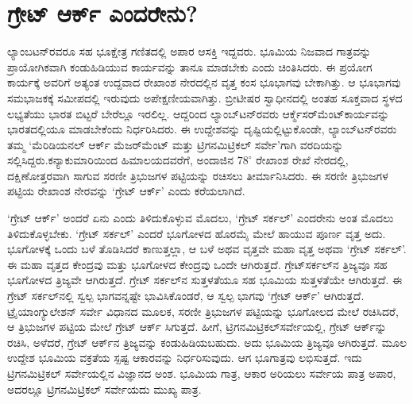 
\chapter{ಗ್ರೇಟ್​ ಆರ್ಕ್ ಎಂದರೇನು?}

ಲ್ಯಾಂಬಟನ್​ರವರೂ ಸಹ ಭೂಕ್ಷೇತ್ರ ಗಣಿತದಲ್ಲಿ ಅಪಾರ ಆಸಕ್ತಿ ಇದ್ದವರು. ಭೂಮಿಯ ನಿಜವಾದ ಗಾತ್ರವನ್ನು ಪ್ರಾಯೋಗಿಕವಾಗಿ ಕಂಡುಹಿಡಿಯುವ ಕಾರ್ಯವನ್ನು ತಾನೂ ಮಾಡಬೇಕು ಎಂದು ಚಿಂತಿಸಿದರು. ಈ ಪ್ರಯೋಗ ಕಾರ್ಯಕ್ಕೆ ಅವರಿಗೆ ಅತ್ಯಂತ ಉದ್ದವಾದ ರೇಖಾಂಶ ನೇರದಲ್ಲಿನ ವೃತ್ತ ಕಂಸ ಭೂಭಾಗವು ಬೇಕಾಗಿತ್ತು. ಆ ಭೂಭಾಗವು ಸಮಭಾಜಕಕ್ಕೆ ಸಮೀಪದಲ್ಲಿ ಇರುವುದು ಅಪೇಕ್ಷಣೀಯವಾಗಿತ್ತು. ಬ್ರೀಟೀಷರ ಸ್ವಾಧೀನದಲ್ಲಿ ಅಂತಹ ಸೂಕ್ತವಾದ ಸ್ಥಳದ ಲಭ್ಯತೆಯು ಭಾರತ ಬಿಟ್ಟರೆ ಬೇರೆಲ್ಲೂ ಇರಲಿಲ್ಲ. ಆದ್ದರಿಂದ ಲ್ಯಾಂಬ್​ಟನ್​ರವರು ಆರ್ಕ್\break ಮೆಸರ್​ಮೆಂಟ್​ ಕಾರ್ಯವನ್ನು ಭಾರತದಲ್ಲಿಯೂ ಮಾಡಬೇಕೆಂದು ನಿರ್ಧರಿಸಿದರು. ಈ ಉದ್ದೇಶವನ್ನು ದೃಷ್ಟಿಯಲ್ಲಿಟ್ಟುಕೊಂಡೇ, ಲ್ಯಾಂಬ್​ಟನ್​ರವರು ತಮ್ಮ ‘ಮೆರಿಡಿಯನಲ್​ ಆರ್ಕ್ ಮೆಜರ್​ಮೆಂಟ್​ ಮತ್ತು ಟ್ರಿಗನಮಿಟ್ರಿಕಲ್​ ಸರ್ವೇ’ಗಾಗಿ ವರದಿಯನ್ನು ಸಲ್ಲಿಸಿದ್ದರು.\break ಕನ್ಯಾಕುಮಾರಿಯಿಂದ ಹಿಮಾಲಯದವರೆಗೆ, ಅಂದಾಜಿನ $78^\circ$ ರೇಖಾಂಶ ರೇಖೆ ನೇರದಲ್ಲಿ, ದಕ್ಷಿಣೋತ್ತರವಾಗಿ ಸಾಗುವ ಸರಣೀ ತ್ರಿಭುಜಗಳ ಪಟ್ಟಿಯನ್ನು ರಚಿಸಲು ತೀರ್ಮಾನಿಸಿದರು. ಈ ಸರಣೀ ತ್ರಿಭುಜಗಳ ಪಟ್ಟಿಯ ರೇಖಾಂಶ ನೇರವನ್ನು ‘ಗ್ರೇಟ್​ ಆರ್ಕ್’ ಎಂದು ಕರೆಯಲಾಗಿದೆ.

`ಗ್ರೇಟ್​ ಆರ್ಕ್’ ಅಂದರೆ ಏನು ಎಂದು ತಿಳಿದುಕೊಳ್ಳುವ ಮೊದಲು, ‘ಗ್ರೇಟ್​ ಸರ್ಕಲ್​’ ಎಂದರೇನು ಅಂತ ಮೊದಲು ತಿಳಿದುಕೊಳ್ಳಬೇಕು. ‘ಗ್ರೇಟ್​ ಸರ್ಕಲ್​’ ಎಂದರೆ ಭೂಗೋಳದ ಹೊರಮೈ ಮೇಲೆ ಹಾಯುವ ಪೂರ್ಣ ವೃತ್ತ ಅದು. ಭೂಗೋಳಕ್ಕೆ ಒಂದು ಬಳೆ ತೊಡಿಸಿದರೆ ಕಾಣುತ್ತಲ್ಲಾ, ಆ ಬಳೆ ಅಥವ ವೃತ್ತವೇ ಮಹಾ ವೃತ್ತ ಅಥವಾ ‘ಗ್ರೇಟ್​ ಸರ್ಕಲ್​’. ಈ ಮಹಾ ವೃತ್ತದ ಕೇಂದ್ರವು ಮತ್ತು ಭೂಗೋಳದ ಕೇಂದ್ರವು ಒಂದೇ ಆಗಿರುತ್ತದೆ. ಗ್ರೇಟ್​ ಸರ್ಕಲ್​ನ ತ್ರಿಜ್ಯವೂ ಸಹ ಭೂಗೋಳದ ತ್ರಿಜ್ಯವೇ ಆಗಿರುತ್ತದೆ. ಗ್ರೇಟ್​ ಸರ್ಕಲ್​ನ ಸುತ್ತಳತೆಯೂ ಸಹ ಭೂಮಿಯ ಸುತ್ತಳತೆಯೇ ಆಗಿರುತ್ತದೆ. ಈ ಗ್ರೇಟ್​ ಸರ್ಕಲ್​ನಲ್ಲಿ ಸ್ವಲ್ಪ ಭಾಗವನ್ನಷ್ಟೇ ಭಾವಿಸಿಕೊಂಡರೆ, ಆ ಸ್ವಲ್ಪ ಭಾಗವು ‘ಗ್ರೇಟ್​ ಆರ್ಕ್’ ಆಗಿರುತ್ತದೆ. ಟ್ರೈಯಾಂಗ್ಯುಲೇಶನ್​ ಸರ್ವೇ ವಿಧಾನದ ಮೂಲಕ, ಸರಣೀ ತ್ರಿಭುಜಗಳ ಪಟ್ಟಿಯನ್ನು ಭೂಗೋಲದ ಮೇಲೆ ರಚಿಸಿದರೆ, ಆ ತ್ರಿಭುಜಗಳ ಪಟ್ಟಿಯ ಮೇಲೆ ಗ್ರೇಟ್​ ಆರ್ಕ್ ಸಿಗುತ್ತದೆ. ಹೀಗೆ, ಟ್ರಿಗನಮಿಟ್ರಿಕಲ್​ ಸರ್ವೇಯಲ್ಲಿ, ಗ್ರೇಟ್​ ಆರ್ಕ್‌ನ್ನು ರಚಿಸಿ, ಅಳೆದರೆ, ಗ್ರೇಟ್​ ಆರ್ಕ್‌ನ ತ್ರಿಜ್ಯವನ್ನು ಕಂಡುಹಿಡಿಯಬಹುದು. ಅದು ಭೂಮಿಯ ತ್ರಿಜ್ಯವೂ ಆಗಿರುತ್ತದೆ. ಮೂಲ ಉದ್ದೇಶ ಭೂಮಿಯ ವಕ್ರತೆಯ ಸ್ಪಷ್ಟ ಆಕಾರವನ್ನು ನಿರ್ಧರಿಸುವುದು. ಆಗ ಭೂಗಾತ್ರವು ಲಭಿಸುತ್ತದೆ. ಇದು ಟ್ರಿಗನಮಿಟ್ರಿಕಲ್​ ಸರ್ವೇಯಲ್ಲಿನ ವಿಜ್ಞಾನದ ಅಂಶ. ಭೂಮಿಯ ಗಾತ್ರ, ಆಕಾರ ಅರಿಯಲು ಸರ್ವೇಯ ಪಾತ್ರ ಅಪಾರ, ಅದರಲ್ಲೂ ಟ್ರಿಗನಮಿಟ್ರಿಕಲ್​ ಸರ್ವೇಯದು ಮುಖ್ಯ ಪಾತ್ರ.

